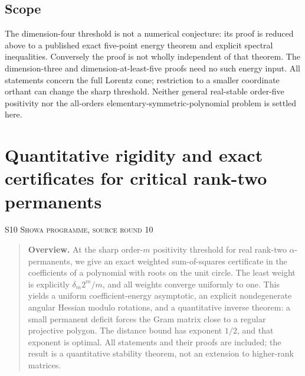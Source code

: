 \documentclass[11pt,a4paper]{article}
\theoremstyle{definition}\newtheorem{definition}[theorem]{Definition}
\theoremstyle{remark}\newtheorem{remark}[theorem]{Remark}
\numberwithin{equation}{section}
\begin{document}
\subsection{Scope}\label{S09-sec-6}
The dimension-four threshold is not a numerical conjecture: its proof is reduced above to a published exact five-point energy theorem and explicit spectral inequalities. Conversely the proof is not wholly independent of that theorem. The dimension-three and dimension-at-least-five proofs need no such energy input. All statements concern the full Lorentz cone; restriction to a smaller coordinate orthant can change the sharp threshold. Neither general real-stable order-five positivity nor the all-orders elementary-symmetric-polynomial problem is settled here.




\clearpage
\section[S10 --- Quantitative rigidity and exact certificates for critical rank-two permanents]{Quantitative rigidity and exact certificates for critical rank-two permanents}\label{contrib-S10}
\noindent\textsc{S10 \quad Showa programme, source round 10}\par\medskip


\begin{quote}\small\textbf{Overview.} At the sharp order-$m$ positivity threshold for real rank-two $\alpha$-permanents, we give an exact weighted sum-of-squares certificate in the coefficients of a polynomial with roots on the unit circle. The least weight is explicitly $\delta_m2^m/m$, and all weights converge uniformly to one. This yields a uniform coefficient-energy asymptotic, an explicit nondegenerate angular Hessian modulo rotations, and a quantitative inverse theorem: a small permanent deficit forces the Gram matrix close to a regular projective polygon. The distance bound has exponent $1/2$, and that exponent is optimal. All statements and their proofs are included; the result is a quantitative stability theorem, not an extension to higher-rank matrices.\end{quote}
\end{document}
